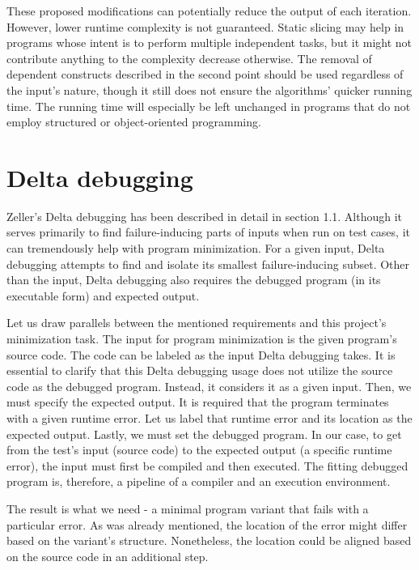 These proposed modifications can potentially reduce the output of each 
iteration.
However, lower runtime complexity is not guaranteed.
Static slicing may help in programs whose intent is to perform multiple 
independent tasks, but it might not contribute anything to the complexity 
decrease otherwise.
The removal of dependent constructs described in the second point should be 
used regardless of the input's nature, though it still does not ensure 
the algorithms' quicker running time.
The running time will especially be left unchanged in programs that do not 
employ structured or object-oriented programming.


\section{Delta debugging}

Zeller's Delta debugging \cite{Zeller99, Zeller01, Zeller02} has been 
described in detail in section 1.1.
Although it serves primarily to find failure-inducing parts of inputs when 
run on test cases, it can tremendously help with program minimization.
For a given input, Delta debugging attempts to find and isolate its 
smallest failure-inducing subset.
Other than the input, Delta debugging also requires the debugged program 
(in its executable form) and expected output.

Let us draw parallels between the mentioned requirements and this project's 
minimization task.
The input for program minimization is the given program's source code.
The code can be labeled as the input Delta debugging takes.
It is essential to clarify that this Delta debugging usage does not utilize 
the source code as the debugged program.
Instead, it considers it as a given input.
Then, we must specify the expected output.
It is required that the program terminates with a given runtime error.
Let us label that runtime error and its location as the expected output.
Lastly, we must set the debugged program.
In our case, to get from the test's input (source code) to the expected 
output (a specific runtime error), the input must first be compiled 
and then executed.
The fitting debugged program is, therefore, a pipeline of a compiler and 
an execution environment.

The result is what we need - a minimal program variant that fails with 
a particular error.
As was already mentioned, the location of the error might differ based 
on the variant's structure.
Nonetheless, the location could be aligned based on the source code in 
an additional step.

